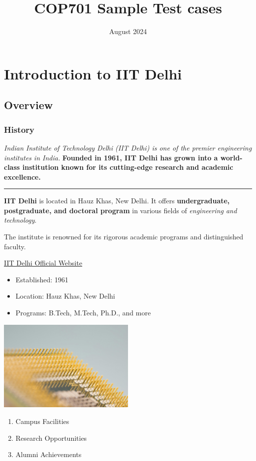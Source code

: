 \documentclass{article}
\title{COP701 Sample Test cases}
\date{August 2024}
\begin{document}
\section{Introduction to IIT Delhi}
\subsection{Overview}
\subsubsection{History}

\textit{Indian Institute of Technology Delhi (IIT Delhi) is one of the premier engineering institutes in India.}
\textbf{Founded in 1961, IIT Delhi has grown into a world-class institution known for its cutting-edge research and academic excellence.}

\hrule

\textbf{IIT Delhi} is located in Hauz Khas, New Delhi. It offers \textbf{undergraduate, postgraduate, and doctoral program} in various fields of \textit{engineering and technology}.\par
The institute is renowned for its rigorous academic programs and distinguished faculty.

\href{https://www.iitd.ac.in}{IIT Delhi Official Website}

\begin{itemize}
    \item Established: 1961
    \item Location: Hauz Khas, New Delhi
    \item Programs: B.Tech, M.Tech, Ph.D., and more
\end{itemize}

\includegraphics[width=0.5\textwidth]{images/technology.jpg}

\begin{enumerate}
    \item Campus Facilities
    \item Research Opportunities
    \item Alumni Achievements
\end{enumerate}


    
\end{document}

